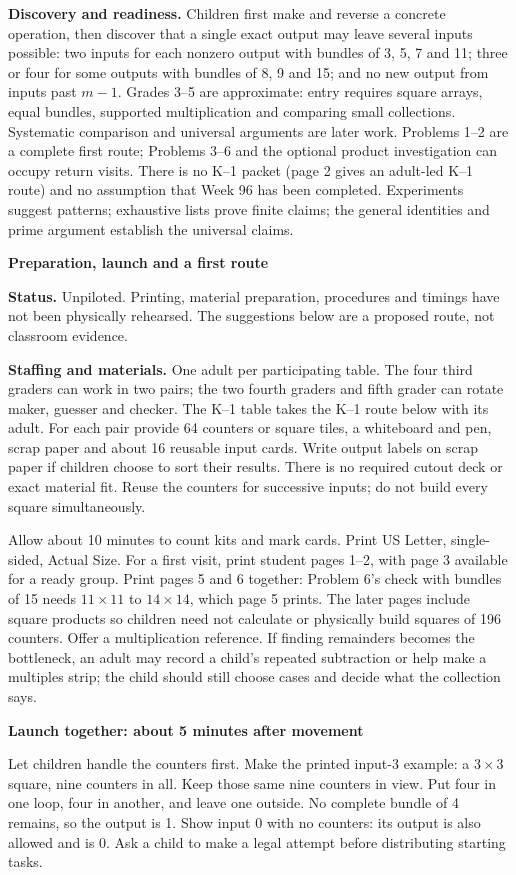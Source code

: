 \documentclass[11pt]{article}
\newcommand{\head}[1]{\par\textbf{\large #1}\par}
\newcommand{\sub}[1]{\par\textbf{#1}\par}
\begin{document}
\textbf{Discovery and readiness.} Children first make and reverse a concrete operation, then discover that a single exact output may leave several inputs possible: two inputs for each nonzero output with bundles of 3, 5, 7 and 11; three or four for some outputs with bundles of 8, 9 and 15; and no new output from inputs past $m-1$. Grades 3--5 are approximate: entry requires square arrays, equal bundles, supported multiplication and comparing small collections. Systematic comparison and universal arguments are later work. Problems 1--2 are a complete first route; Problems 3--6 and the optional product investigation can occupy return visits. There is no K--1 packet (page 2 gives an adult-led K--1 route) and no assumption that Week 96 has been completed. Experiments suggest patterns; exhaustive lists prove finite claims; the general identities and prime argument establish the universal claims.
\newpage
\head{Preparation, launch and a first route}
\textbf{Status.} Unpiloted. Printing, material preparation, procedures and timings have not been physically rehearsed. The suggestions below are a proposed route, not classroom evidence.

\textbf{Staffing and materials.} One adult per participating table. The four third graders can work in two pairs; the two fourth graders and fifth grader can rotate maker, guesser and checker. The K--1 table takes the K--1 route below with its adult. For each pair provide 64 counters or square tiles, a whiteboard and pen, scrap paper and about 16 reusable input cards. Write output labels on scrap paper if children choose to sort their results. There is no required cutout deck or exact material fit. Reuse the counters for successive inputs; do not build every square simultaneously.

Allow about 10 minutes to count kits and mark cards. Print US Letter, single-sided, Actual Size. For a first visit, print student pages 1--2, with page 3 available for a ready group. Print pages 5 and 6 together: Problem 6's check with bundles of 15 needs $11\times11$ to $14\times14$, which page 5 prints. The later pages include square products so children need not calculate or physically build squares of 196 counters. Offer a multiplication reference. If finding remainders becomes the bottleneck, an adult may record a child's repeated subtraction or help make a multiples strip; the child should still choose cases and decide what the collection says.

\sub{Launch together: about 5 minutes after movement}
Let children handle the counters first. Make the printed input-3 example: a $3\times3$ square, nine counters in all. Keep those same nine counters in view. Put four in one loop, four in another, and leave one outside. No complete bundle of 4 remains, so the output is 1. Show input 0 with no counters: its output is also allowed and is 0. Ask a child to make a legal attempt before distributing starting tasks.
\end{document}
